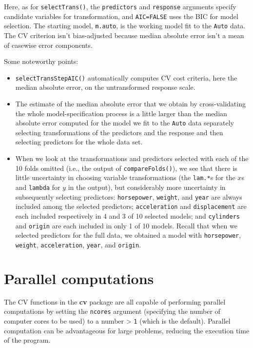 \documentclass[
]{jss}
\providecommand{\tightlist}{%
  \setlength{\itemsep}{0pt}\setlength{\parskip}{0pt}}
\begin{document}
Here, as for \texttt{selectTrans()}, the \texttt{predictors} and
\texttt{response} arguments specify candidate variables for
transformation, and \texttt{AIC=FALSE} uses the BIC for model selection.
The starting model, \texttt{m.auto}, is the working model fit to the
\texttt{Auto} data. The CV criterion isn't bias-adjusted because median
absolute error isn't a mean of casewise error components.

Some noteworthy points:

\begin{itemize}
\tightlist
\item
  \texttt{selectTransStepAIC()} automatically computes CV cost criteria,
  here the median absolute error, on the untransformed response scale.
\item
  The estimate of the median absolute error that we obtain by
  cross-validating the whole model-specification process is a little
  larger than the median absolute error computed for the model we fit to
  the \texttt{Auto} data separately selecting transformations of the
  predictors and the response and then selecting predictors for the
  whole data set.
\item
  When we look at the transformations and predictors selected with each
  of the 10 folds omitted (i.e., the output of \texttt{compareFolds()}),
  we see that there is little uncertainty in choosing variable
  transformations (the \texttt{lam.*}s for the \(x\)s and
  \texttt{lambda} for \(y\) in the output), but considerably more
  uncertainty in subsequently selecting predictors: \texttt{horsepower},
  \texttt{weight}, and \texttt{year} are always included among the
  selected predictors; \texttt{acceleration} and \texttt{displacement}
  are each included respectively in 4 and 3 of 10 selected models; and
  \texttt{cylinders} and \texttt{origin} are each included in only 1 of
  10 models. Recall that when we selected predictors for the full data,
  we obtained a model with \texttt{horsepower}, \texttt{weight},
  \texttt{acceleration}, \texttt{year}, and \texttt{origin}.
\end{itemize}

\hypertarget{parallel-computations}{%
\section{Parallel computations}\label{parallel-computations}}

The CV functions in the \textbf{cv} package are all capable of
performing parallel computations by setting the \texttt{ncores} argument
(specifying the number of computer cores to be used) to a number
\textgreater{} \texttt{1} (which is the default). Parallel computation
can be advantageous for large problems, reducing the execution time of
the program.
\end{document}
